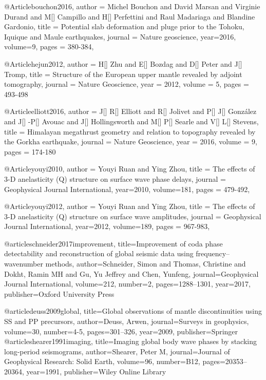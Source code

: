 @Article{bouchon2016,
  author =	 {Michel Bouchon and David Marsan and Virginie Durand and M[] Campillo and H[] Perfettini and Raul Madariaga and Blandine Gardonio},
  title =	 {Potential slab deformation and pluge prior to the {T}ohoku, {I}quique and {M}aule earthquakes},
  journal =	 {Nature geoscience},
  year=2016,
  volume=9,
  pages =	 {380-384},
}

@Article{hejun2012,
  author = 	 {H[] Zhu and E[] Bozdag and D[] Peter and J[] Tromp},
  title = 	 {Structure of the European upper mantle revealed by adjoint tomography},
  journal = 	 {Nature Geoscience},
  year = 	 2012,
  volume = 5,
  pages =	 {493-498}
}

@Article{elliott2016,
  author = 	 {J[] R[] Elliott and R[] Jolivet and P[] J[] Gonz\'{a}lez and J[] -P[] Avouac and J[] Hollingsworth and M[] P[] Searle and V[] L[] Stevens},
  title = 	 {Himalayan megathrust geometry and relation to topography revealed by the {G}orkha earthquake},
  journal = 	 {Nature Geoscience},
  year = 	 2016,
  volume = 9,
  pages =	 {174-180}
}

@Article{youyi2010,
  author =	 {Youyi Ruan and Ying Zhou},
  title =	 {The effects of 3-D anelasticity (Q) structure on surface wave phase delays},
  journal =	 {Geophysical Journal International},
  year=2010,
  volume=181,
  pages =	 {479-492},
}

@Article{youyi2012,
  author =	 {Youyi Ruan and Ying Zhou},
  title =	 {The effects of 3-D anelasticity (Q) structure on surface wave amplitudes},
  journal =	 {Geophysical Journal International},
  year=2012,
  volume=189,
  pages =	 {967-983},
}

@article{schneider2017improvement,
  title={Improvement of coda phase detectability and reconstruction of global seismic data using frequency--wavenumber methods},
  author={Schneider, Simon and Thomas, Christine and Dokht, Ramin MH and Gu, Yu Jeffrey and Chen, Yunfeng},
  journal={Geophysical Journal International},
  volume={212},
  number={2},
  pages={1288--1301},
  year={2017},
  publisher={Oxford University Press}
}


@article{deuss2009global,
  title={Global observations of mantle discontinuities using SS and PP precursors},
  author={Deuss, Arwen},
  journal={Surveys in geophysics},
  volume={30},
  number={4-5},
  pages={301--326},
  year={2009},
  publisher={Springer}
}
@article{shearer1991imaging,
  title={Imaging global body wave phases by stacking long-period seismograms},
  author={Shearer, Peter M},
  journal={Journal of Geophysical Research: Solid Earth},
  volume={96},
  number={B12},
  pages={20353--20364},
  year={1991},
  publisher={Wiley Online Library}
}


